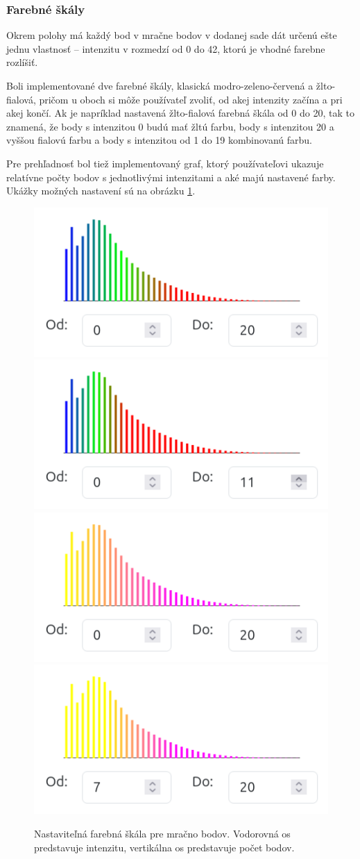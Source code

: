 \subsubsection{Farebné škály}

Okrem polohy má každý bod v mračne bodov v dodanej sade dát určenú ešte jednu vlastnosť -- intenzitu v rozmedzí od 0 do 42, ktorú je vhodné farebne rozlíšiť.

Boli implementované dve farebné škály, klasická modro-zeleno-červená a žlto-fialová, pričom u oboch si môže používateľ zvoliť, od akej intenzity začína a pri akej končí. Ak je napríklad nastavená žlto-fialová farebná škála od 0 do 20, tak to znamená, že body s intenzitou 0 budú mať žltú farbu, body s intenzitou 20 a vyššou fialovú farbu a body s intenzitou od 1 do 19 kombinovanú farbu.

Pre prehľadnosť bol tiež implementovaný graf, ktorý používateľovi ukazuje relatívne počty bodov s jednotlivými intenzitami a aké majú nastavené farby. Ukážky možných nastavení sú na obrázku \ref{fig:farebna_skala}.

\begin{figure}[h]
    \centering
    \includegraphics[width=0.35\linewidth]{text_prace/obrazky-figures/farebna_skala1.png}
    \includegraphics[width=0.35\linewidth]{text_prace/obrazky-figures/farebna_skala2.png}
    \includegraphics[width=0.35\linewidth]{text_prace/obrazky-figures/farebna_skala3.png}
    \includegraphics[width=0.35\linewidth]{text_prace/obrazky-figures/farebna_skala4.png}
    \caption{Nastaviteľná farebná škála pre mračno bodov. Vodorovná os predstavuje intenzitu, vertikálna os predstavuje počet bodov.}
    \label{fig:farebna_skala}
\end{figure}

